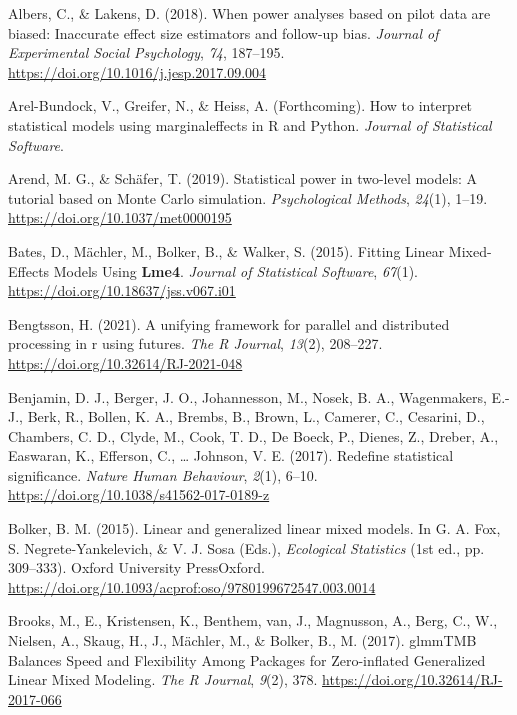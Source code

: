 \documentclass[
  man,
  floatsintext,
  longtable,
  a4paper,
  nolmodern,
  notxfonts,
  notimes,
  colorlinks=true,linkcolor=blue,citecolor=blue,urlcolor=blue]{apa7}
\newlength{\cslhangindent}
\newenvironment{CSLReferences}[2] %
 {\begin{list}{}{%
  \setlength{\itemindent}{0pt}
  \setlength{\leftmargin}{0pt}
  \setlength{\parsep}{0pt}
  \ifodd #1
   \setlength{\leftmargin}{\cslhangindent}
   \setlength{\itemindent}{-1\cslhangindent}
  \fi
  \setlength{\itemsep}{#2\baselineskip}}}
 {\end{list}}
\begin{document}
\label{refs}
\begin{CSLReferences}{1}{0}
Albers, C., \& Lakens, D. (2018). When power analyses based on pilot
data are biased: {Inaccurate} effect size estimators and follow-up bias.
\emph{Journal of Experimental Social Psychology}, \emph{74}, 187--195.
\url{https://doi.org/10.1016/j.jesp.2017.09.004}

Arel-Bundock, V., Greifer, N., \& Heiss, A. (Forthcoming). How to
interpret statistical models using {marginaleffects} in {R} and
{Python}. \emph{Journal of Statistical Software}.

Arend, M. G., \& Schäfer, T. (2019). Statistical power in two-level
models: {A} tutorial based on {Monte Carlo} simulation.
\emph{Psychological Methods}, \emph{24}(1), 1--19.
\url{https://doi.org/10.1037/met0000195}

Bates, D., Mächler, M., Bolker, B., \& Walker, S. (2015). Fitting
{Linear Mixed-Effects Models Using} {\textbf{Lme4}}. \emph{Journal of
Statistical Software}, \emph{67}(1).
\url{https://doi.org/10.18637/jss.v067.i01}

Bengtsson, H. (2021). A unifying framework for parallel and distributed
processing in r using futures. \emph{The R Journal}, \emph{13}(2),
208--227. \url{https://doi.org/10.32614/RJ-2021-048}

Benjamin, D. J., Berger, J. O., Johannesson, M., Nosek, B. A.,
Wagenmakers, E.-J., Berk, R., Bollen, K. A., Brembs, B., Brown, L.,
Camerer, C., Cesarini, D., Chambers, C. D., Clyde, M., Cook, T. D., De
Boeck, P., Dienes, Z., Dreber, A., Easwaran, K., Efferson, C., \ldots{}
Johnson, V. E. (2017). Redefine statistical significance. \emph{Nature
Human Behaviour}, \emph{2}(1), 6--10.
\url{https://doi.org/10.1038/s41562-017-0189-z}

Bolker, B. M. (2015). Linear and generalized linear mixed models. In G.
A. Fox, S. Negrete-Yankelevich, \& V. J. Sosa (Eds.), \emph{Ecological
{Statistics}} (1st ed., pp. 309--333). Oxford University PressOxford.
\url{https://doi.org/10.1093/acprof:oso/9780199672547.003.0014}

Brooks, M., E., Kristensen, K., Benthem, van, J., Magnusson, A., Berg,
C., W., Nielsen, A., Skaug, H., J., Mächler, M., \& Bolker, B., M.
(2017). {glmmTMB Balances Speed} and {Flexibility Among Packages} for
{Zero-inflated Generalized Linear Mixed Modeling}. \emph{The R Journal},
\emph{9}(2), 378. \url{https://doi.org/10.32614/RJ-2017-066}


\end{CSLReferences}
\end{document}
